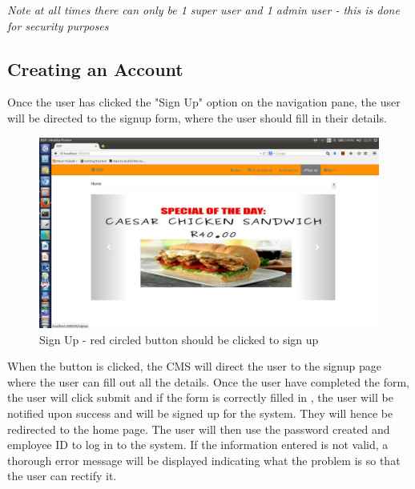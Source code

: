 \documentclass[a4paper,12pt]{article}
\begin{document}
{\em* Note at all times there can only be 1 super user and 1 admin user - this is done for security purposes  } \\
 

\subsection{Creating an Account} 
Once the user has clicked the "Sign Up" option on the navigation pane, the user will be directed to the signup form, where the user should fill in their details. 

\begin{figure}[H]
  \centering
    \includegraphics[width=1.0\textwidth]{screenshots/signUp.png}
    \caption{Sign Up - red circled button should be clicked to sign up} 
\end{figure}

When the button is clicked, the CMS will direct the user to the signup page where the user can fill out all the details. Once the user have completed the form, the user will click submit and if the form is correctly filled in , the user will be notified upon success and will be signed up for the system. They will hence be redirected to the home page. The user will then use the password created and employee ID to log in to the system. If the information entered is not valid, a thorough error message will be displayed indicating what the problem is so that the user can rectify it.
\end{document}
